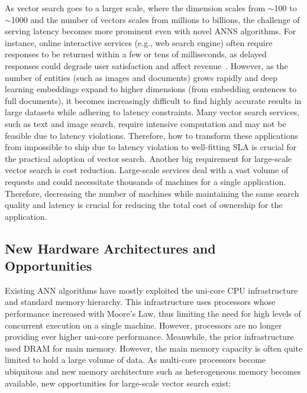 As vector search goes to a larger scale, where the dimension scales from $\sim$100 to $\sim$1000 and the number of vectors scales from millions to billions, the challenge of serving latency becomes more prominent even with novel ANNS algorithms. For instance, online interactive services (e.g., web search engine) often require responses to be returned within a few or tens of milliseconds, as delayed responses could degrade user satisfaction and affect revenue~\cite{reduce-web-latency}. However, as the number of entities (such as images and documents) grows rapidly and deep learning embeddings expand to higher dimensions (from embedding sentences to full documents), it becomes increasingly difficult to find highly accurate results in large datasets while adhering to latency constraints. Many vector search services, such as text and image search, require intensive computation and may not be feasible due to latency violations. Therefore, how to transform these applications from impossible to ship due to latency violation to well-fitting SLA is crucial for the practical adoption of vector search. Another big requirement for large-scale vector search is cost reduction. Large-scale services deal with a vast volume of requests and could necessitate thousands of machines for a single application. Therefore, decreasing the number of machines while maintaining the same search quality and latency is crucial for reducing the total cost of ownership for the application.

\subsection{New Hardware Architectures and Opportunities}

Existing ANN algorithms have mostly exploited the uni-core CPU infrastructure and standard memory hierarchy. This infrastructure uses processors whose performance increased with Moore's Law, thus limiting the need for high levels of concurrent execution on a single machine. However, processors are no longer providing ever higher uni-core performance. Meanwhile, the prior infrastructure used DRAM for main memory. However, the main memory capacity is often quite limited to hold a large volume of data. As multi-core processors become ubiquitous and new memory architecture such as heterogeneous memory becomes available, new opportunities for large-scale vector search exist:

